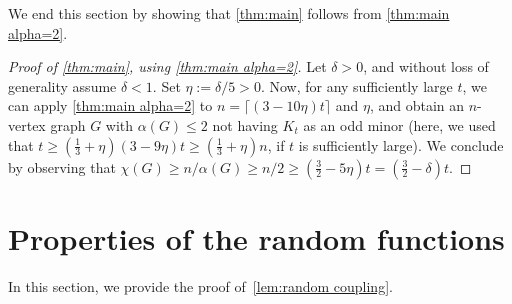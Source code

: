\documentclass[11pt,reqno,oneside]{amsart}
\theoremstyle{definition}
\newcommand\1{\mathbf{1}}
\let\leq\leqslant
\let\geq\geqslant
\begin{document}
We end this section by showing that \cref{thm:main} follows from \cref{thm:main alpha=2}.

\begin{proof}[Proof of \cref{thm:main}, using \cref{thm:main alpha=2}]
Let $\delta>0$, and without loss of generality assume $\delta<1$. Set $\eta:=\delta/5>0$. Now, for any sufficiently large $t$, we can apply \cref{thm:main alpha=2} to $n=\lceil (3-10\eta)t\rceil$ and $\eta$, and obtain an $n$-vertex graph $G$ with $\alpha(G)\leq 2$ not having $K_t$ as an odd minor (here, we used that $t\geq (\frac{1}{3}+\eta)(3-9\eta)t\geq (\frac{1}{3}+\eta)n$, if $t$ is sufficiently large). We conclude by observing that $\chi(G)\geq n/\alpha(G)\geq n/2\geq (\frac{3}{2}-5\eta)t=(\frac{3}{2}-\delta)t$.
\end{proof}

\section{Properties of the random functions}\label{sec:coupling}
In this section, we provide the proof of~\cref{lem:random coupling}.
\end{document}
